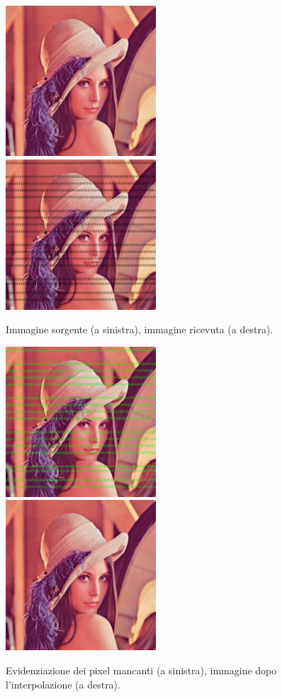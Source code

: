 \begin{figure}[ht]
\includegraphics[width=0.50\textwidth]{../images/lena1.png}
\includegraphics[width=0.50\textwidth]{../images/lena2.png}
	\caption{Immagine sorgente (a sinistra), immagine ricevuta (a destra).}
\includegraphics[width=0.50\textwidth]{../images/lena3.png}
\includegraphics[width=0.50\textwidth]{../images/lena4.png}
	\caption{Evidenziazione dei pixel mancanti (a sinistra), immagine dopo
	l'interpolazione (a destra).}
\end{figure}

